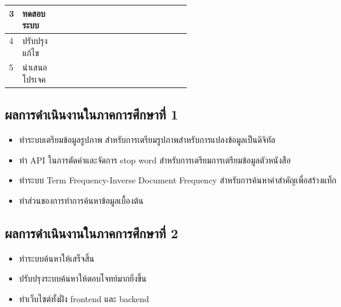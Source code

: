 \begin{table}[H]
\begin{tabular}{|l|p{0.35\linewidth}|l|l|l|l|l|l|l|l|l|l|l|l|l|l|l|l|}
3                  & ทดสอบระบบ                   &                          &                          &                          &                          & \cellcolor[HTML]{656565} & \cellcolor[HTML]{656565} & \cellcolor[HTML]{656565} & \cellcolor[HTML]{656565} & \cellcolor[HTML]{656565} & \cellcolor[HTML]{656565} & \cellcolor[HTML]{656565} & \cellcolor[HTML]{656565} & \cellcolor[HTML]{656565} & \cellcolor[HTML]{656565} &                          &                          \\ \hline
4                  & ปรับปรุงแก้ไข                   &                          &                          &                          &                          & \cellcolor[HTML]{656565} & \cellcolor[HTML]{656565} & \cellcolor[HTML]{656565} & \cellcolor[HTML]{656565} & \cellcolor[HTML]{656565} & \cellcolor[HTML]{656565} & \cellcolor[HTML]{656565} & \cellcolor[HTML]{656565} & \cellcolor[HTML]{656565} & \cellcolor[HTML]{656565} &                          &                          \\ \hline
5                  & นำเสนอโปรเจค                   &                          &                          &                          &                          &                          &                          &                          &                          &                          &                          &                          &                          &                          &                          & \cellcolor[HTML]{656565} & \cellcolor[HTML]{656565} \\ \hline
\end{tabular}
\end{table}

\subsection{ผลการดำเนินงานในภาคการศึกษาที่ 1}
\begin{itemize}
    \item ทำระบบเตรียมข้อมูลรูปภาพ สำหรับการเตรียมรูปภาพสำหรับการแปลงข้อมูลเป็นดิจิทัล
    \item ทำ API ในการตัดคำและจัดการ stop word สำหรับการเตรียมการเตรียมข้อมูลตัวหนังสือ
    \item ทำระบบ Term Frequency-Inverse Document Frequency สำหรับการค้นหาคำสำคัญเพื่อสร้างแท็ก 
    \item ทำส่วนของการทำการค้นหาข้อมูลเบื้องต้น
\end{itemize}

\subsection{ผลการดำเนินงานในภาคการศึกษาที่ 2}
\begin{itemize}
    \item ทำระบบค้นหาให้เสร็จสิ้น
    \item ปรับปรุงระบบค้นหาให้ตอบโจทย์มากยิ่งขึ้น
    \item ทำเว็บไซต์ทั้งฝั่ง frontend และ backend
\end{itemize}
